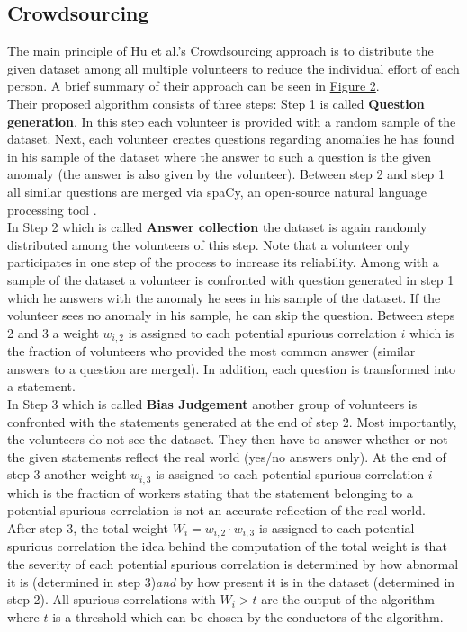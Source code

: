 \documentclass{article}
\begin{document}
\subsection{Crowdsourcing}
The main principle of Hu et al.'s Crowdsourcing approach \cite{10.1145/3366423.3380063} is to distribute the given dataset among all multiple volunteers to reduce the individual effort of each person. A brief summary of their approach can be seen in \hyperref[fig:crowdsourcing]{Figure 2}. \\
Their proposed algorithm consists of three steps: Step 1 is called \textbf{Question generation}. In this step each volunteer is provided with a random sample of the dataset. Next, each volunteer creates questions regarding anomalies he has found in his sample of the dataset where the answer to such a question is the given anomaly (the answer is also given by the volunteer). Between step 2 and step 1 all similar questions are merged via spaCy, an open-source natural language processing tool \cite{spaCy}. \\
In Step 2 which is called \textbf{Answer collection} the dataset is again randomly distributed among the volunteers of this step. Note that a volunteer only participates in one step of the process to increase its reliability. Among with a sample of the dataset a volunteer is confronted with question generated in step 1 which he answers with the anomaly he sees in his sample of the dataset. If the volunteer sees no anomaly in his sample, he can skip the question. Between steps 2 and 3 a weight $w_{i,2}$ is assigned to each potential spurious correlation $i$ which is the fraction of volunteers who provided the most common answer (similar answers to a question are merged). In addition, each question is transformed into a statement. \\
In Step 3 which is called \textbf{Bias Judgement} another group of volunteers is confronted with the statements generated at the end of step 2. Most importantly, the volunteers do not see the dataset. They then have to answer whether or not the given statements reflect the real world (yes/no answers only). At the end of step 3 another weight $w_{i,3}$ is assigned to each potential spurious correlation $i$ which is the fraction of workers stating that the statement belonging to a potential spurious correlation is not an accurate reflection of the real world. \\
After step 3, the total weight $W_{i}=w_{i,2} \cdot w_{i,3}$ is assigned to each potential spurious correlation the idea behind the computation of the total weight is that the severity of each potential spurious correlation is determined by how abnormal it is (determined in step 3)\textit{and} by how present it is in the dataset (determined in step 2). All spurious correlations with $W_i > t$ are the output of the algorithm where $t$ is a threshold which can be chosen by the conductors of the algorithm. \\
\end{document}
